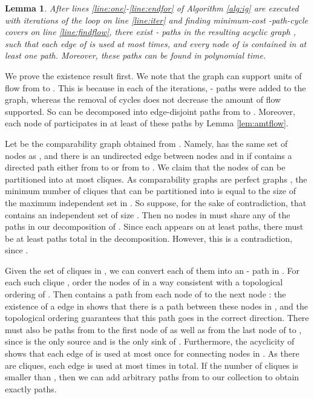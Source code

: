 \documentclass[11pt]{article}
\newcommand{\qed}{\hspace*{\fill}}
\newtheorem{lemma}[theorem]{Lemma}
\newenvironment{proof}[1][Proof. ]{\noindent {\bf #1 }}{\qed}
\begin{document}
\begin{lemma} \label{lem:kpaths}
After lines \ref{line:one}-\ref{line:endfor} of Algorithm \ref{alg:ig} are executed with  iterations of the 
loop on line \ref{line:iter} and finding minimum-cost -path-cycle covers on line \ref{line:findflow}, there 
exist  - paths in the resulting acyclic graph , such that each edge of  is used at most  times, 
and every node of  is contained in at least one path. Moreover, these paths can be found in polynomial time.
\end{lemma}
\begin{proof}
We prove the existence result first. 
We note that the graph  can support  units of flow from  to . This is because in each of the  
iterations,  - paths were added to the graph, whereas the removal of cycles does not decrease the 
amount of flow supported. So  can be decomposed into  edge-disjoint paths from  to . Moreover,
 each node of  participates in at least  of these paths by Lemma \ref{lem:amtflow}.

Let  be the comparability graph obtained from . Namely,  has the same set of nodes as , and there
 is an undirected edge between nodes  and  in  if  contains a directed path either from  to 
 or from  to . We claim that the nodes of  can be partitioned into at most  cliques. As comparability
 graphs are perfect graphs \cite{golumbic}, the minimum number of cliques that  can be partitioned into is
 equal to the size of the maximum independent set in . So suppose, for the sake of contradiction, that  
contains an independent set  of size . Then no nodes in  must share any of the paths in our decomposition
 of . Since each appears on at least  paths, there must be at least  paths total 
in the decomposition. However, this is a contradiction, 
since .

Given the set of  cliques in , we can convert each of them into an - path in . For each
 such clique , order the nodes of  in a way consistent with a topological ordering of . Then
  contains a path from each node  of  to the next node : the existence of a  edge in 
 shows that there is a path between these nodes in , and the topological ordering guarantees that this
 path goes in the correct direction. There must also be paths from  to the first node of  as well as
 from the last node of  to , since  is the only source and  is the only sink of . Furthermore,
 the acyclicity of  shows that each edge of  is used at most once for connecting nodes in . As there
 are  cliques, each edge is used at most  times in total. If the number of cliques is smaller than ,
 then we can add arbitrary paths from  to our collection to obtain exactly  paths. 


\end{proof}
\end{document}
